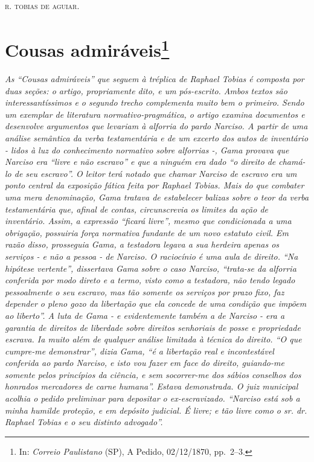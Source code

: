 {\begin{flushright}
\textsc{r. tobias de aguiar}.
\end{flushright}

\chapter{Cousas admiráveis\footnote{ In: \emph{Correio Paulistano} (SP), A Pedido, 02/12/1870,
  pp.~2--3.}} %

\begin{didascalia}
\emph{As ``Cousas admiráveis'' que seguem à tréplica de Raphael Tobias é
composta por duas seções: o artigo, propriamente dito, e um pós-escrito.
Ambos textos são interessantíssimos e o segundo trecho complementa muito
bem o primeiro. Sendo um exemplar de literatura normativo-pragmática, o
artigo examina documentos e desenvolve argumentos que levariam à
alforria do pardo Narciso. A partir de uma análise semântica da verba
testamentária e de um excerto dos autos de inventário - lidos à luz do
conhecimento normativo sobre alforrias -, Gama provava que Narciso era
``livre e não escravo'' e que a ninguém era dado ``o direito de chamá-lo de
seu escravo''. O leitor terá notado que chamar Narciso de escravo era um
ponto central da exposição fática feita por Raphael Tobias. Mais do que
combater uma mera denominação, Gama tratava de estabelecer balizas sobre
o teor da verba testamentária que, afinal de contas, circunscrevia os
limites da ação de inventário. Assim, a expressão ``ficará livre'', mesmo
que condicionada a uma obrigação, possuiria força normativa fundante de
um novo estatuto civil. Em razão disso, prosseguia Gama, a testadora
legava a sua herdeira apenas os serviços - e não a pessoa - de Narciso.
O raciocínio é uma aula de direito. ``Na hipótese vertente'', dissertava
Gama sobre o caso Narciso, ``trata-se da alforria conferida por modo
direto e a termo, visto como a testadora, não tendo legado pessoalmente
o seu escravo, mas tão somente os serviços por prazo fixo, faz depender
o pleno gozo da libertação que ela concede de uma condição que impõem ao
liberto''. A luta de Gama - e evidentemente também a de Narciso - era a
garantia de direitos de liberdade sobre direitos senhoriais de posse e
propriedade escrava. Ia muito além de qualquer análise limitada à
técnica do direito. ``O que cumpre-me demonstrar'', dizia Gama, ``é a
libertação real e incontestável conferida ao pardo Narciso, e isto vou
fazer em face do direito, guiando-me somente pelos princípios da
ciência, e sem socorrer-me dos sábios conselhos dos honrados mercadores
de carne humana''. Estava demonstrada. O juiz municipal acolhia o pedido
preliminar para depositar o ex-escravizado. ``Narciso está sob a minha
humilde proteção, e em depósito judicial. É livre; e tão livre como o
sr. dr. Raphael Tobias e o seu distinto advogado''.}
\end{didascalia}

}
